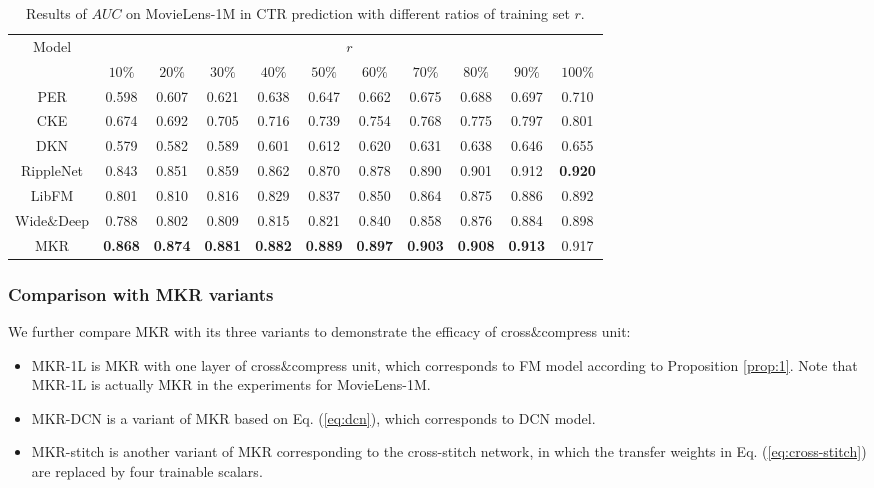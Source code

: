 \documentclass[sigconf]{acmart}
\begin{document}
        	\begin{table*}[t]
\setlength{\tabcolsep}{8pt}
                \centering
                \caption{Results of $AUC$ on MovieLens-1M in CTR prediction with different ratios of training set $r$.}
                \begin{tabular}{c|cccccccccc}
                    \hline
                    \multirow{2}{*}{Model} & \multicolumn{10}{c}{$r$} \\
                    \cline{2-11}
                    & $10\%$ & $20\%$ & $30\%$ & $40\%$ & $50\%$ & $60\%$ & $70\%$ & $80\%$ & $90\%$ & $100\%$ \\
                    \hline
                    PER & 0.598 & 0.607 & 0.621 & 0.638 & 0.647 & 0.662 & 0.675 & 0.688 & 0.697 & 0.710 \\
                    CKE & 0.674 & 0.692 & 0.705 & 0.716 & 0.739 & 0.754 & 0.768 & 0.775 & 0.797 & 0.801 \\
                    DKN & 0.579 & 0.582 & 0.589 & 0.601 & 0.612 & 0.620 & 0.631 & 0.638 & 0.646 & 0.655 \\
                    RippleNet & 0.843 & 0.851 & 0.859 & 0.862 & 0.870 & 0.878 & 0.890 & 0.901 & 0.912 & \textbf{0.920} \\
                    LibFM & 0.801 & 0.810 & 0.816 & 0.829 & 0.837 & 0.850 & 0.864 & 0.875 & 0.886 & 0.892 \\
                    Wide$\&$Deep & 0.788 & 0.802 & 0.809 & 0.815 & 0.821 & 0.840 & 0.858 & 0.876 & 0.884 & 0.898 \\
                    \hline
                    MKR & \textbf{0.868} & \textbf{0.874} & \textbf{0.881} & \textbf{0.882} & \textbf{0.889} & \textbf{0.897} & \textbf{0.903} & \textbf{0.908} & \textbf{0.913} & 0.917 \\
                    \hline
				\end{tabular}
				\label{table:sparse}
			\end{table*}
        	
        
        
        \subsubsection{Comparison with MKR variants}
       		We further compare MKR with its three variants to demonstrate the efficacy of cross$\&$compress unit:
       		\begin{itemize}
       			\item MKR-1L is MKR with one layer of cross$\&$compress unit, which corresponds to FM model according to Proposition \ref{prop:1}.
       			Note that MKR-1L is actually MKR in the experiments for MovieLens-1M.
        		\item MKR-DCN is a variant of MKR based on Eq. (\ref{eq:dcn}), which corresponds to DCN model.
        		\item MKR-stitch is another variant of MKR corresponding to the cross-stitch network, in which the transfer weights in Eq. (\ref{eq:cross-stitch}) are replaced by four trainable scalars.
       		\end{itemize}
        
\end{document}

